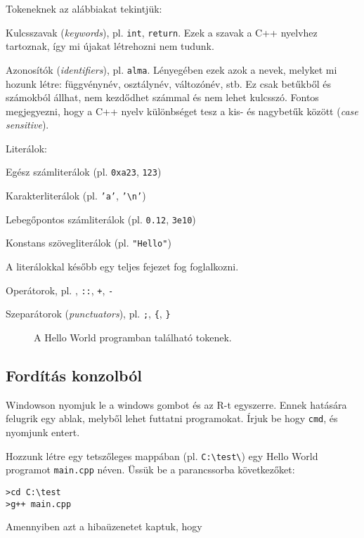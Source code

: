 \documentclass[../cpp_book/cpp_book.tex]{subfiles}
\begin{document}
	Tokeneknek az alábbiakat tekintjük:
	\begin{compactitem}
		\item Kulcsszavak (\textit{keywords}), pl. \texttt{int}, \texttt{return}. Ezek a szavak a C++ nyelvhez tartoznak, így mi újakat létrehozni nem tudunk.
		\item Azonosítók (\textit{identifiers}), pl. \texttt{alma}. Lényegében ezek azok a nevek, melyket mi hozunk létre: függvénynév, osztálynév, változónév, stb. Ez csak betűkből és számokból állhat, nem kezdődhet számmal és nem lehet kulcsszó. Fontos megjegyezni, hogy a C++ nyelv különbséget tesz a kis- és nagybetűk között (\textit{case sensitive}).
 		\item Literálok:
		\begin{compactitem}
			\item Egész számliterálok (pl. \texttt{0xa23}, \texttt{123})
			\item Karakterliterálok (pl. \texttt{'a'}, \texttt{'\textbackslash n'})
			\item Lebegőpontos számliterálok (pl. \texttt{0.12}, \texttt{3e10})
			\item Konstans szövegliterálok (pl. \texttt{"Hello"})
		\end{compactitem}
		A literálokkal később egy teljes fejezet fog foglalkozni.
		\item Operátorok, pl. \texttt{\<}, \texttt{::}, \texttt{+}, \texttt{-}
		\item Szeparátorok (\textit{punctuators}), pl. \texttt{;}, \texttt{\{}, \texttt{\}}
	\end{compactitem}
	\begin{figure}[!h]
		\centering
		
		\caption{A Hello World programban található tokenek.}\label{fig_tokens}
	\end{figure}
	\subsection{Fordítás konzolból}
	Windowson nyomjuk le a windows gombot és az R-t egyszerre. Ennek hatására felugrik egy ablak, melyből lehet futtatni programokat. Írjuk be hogy \texttt{cmd}, és nyomjunk entert. 
	
	Hozzunk létre egy tetszőleges mappában (pl. \texttt{C:\textbackslash test\textbackslash}) egy Hello World programot \texttt{main.cpp} néven. Üssük be a parancssorba következőket:
	\begin{lstlisting}
>cd C:\test
>g++ main.cpp
	\end{lstlisting}
	Amennyiben azt a hibaüzenetet kaptuk, hogy 
	
\end{document}

